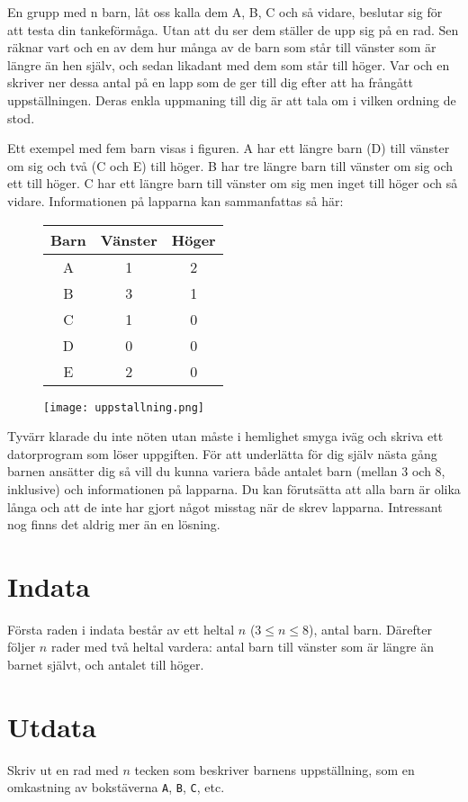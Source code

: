En grupp med n barn, låt oss kalla dem A, B, C och så vidare, beslutar sig för att testa din tankeförmåga.
Utan att du ser dem ställer de upp sig på en rad.
Sen räknar vart och en av dem hur många av de barn som står till vänster som är längre än hen själv, och sedan likadant med dem som står till höger.
Var och en skriver ner dessa antal på en lapp som de ger till dig efter att ha frångått uppställningen.
Deras enkla uppmaning till dig är att tala om i vilken ordning de stod.

Ett exempel med fem barn visas i figuren.
A har ett längre barn (D) till vänster om sig och två (C och E) till höger.
B har tre längre barn till vänster om sig och ett till höger.
C har ett längre barn till vänster om sig men inget till höger och så vidare.
Informationen på lapparna kan sammanfattas så här:

\begin{figure}[h!]
  \centering

\begin{minipage}{.5\textwidth}
    \begin{tabular}[b]{|c|c|c|}
    \hline
      Barn&Vänster&Höger\\\hline
      A&1&2\\
      B&3&1\\
      C&1&0\\
      D&0&0\\
      E&2&0\\\hline
    \end{tabular}
\end{minipage}%
\begin{minipage}{.5\textwidth}
    \texttt{[image: uppstallning.png]}
\end{minipage}

\end{figure}

Tyvärr klarade du inte nöten utan måste i hemlighet smyga iväg och skriva ett datorprogram som löser uppgiften.
För att underlätta för dig själv nästa gång barnen ansätter dig så vill du kunna variera både antalet barn (mellan 3 och 8, inklusive) och informationen på lapparna.
Du kan förutsätta att alla barn är olika långa och att de inte har gjort något misstag när de skrev lapparna.
Intressant nog finns det aldrig mer än en lösning.

\section*{Indata}
Första raden i indata består av ett heltal $n$ ($3 \le n \le 8$), antal barn.
Därefter följer $n$ rader med två heltal vardera: antal barn till vänster som är längre än barnet självt, och antalet till höger.

\section*{Utdata}
Skriv ut en rad med $n$ tecken som beskriver barnens uppställning, som en omkastning av bokstäverna \texttt{A}, \texttt{B}, \texttt{C}, etc.
